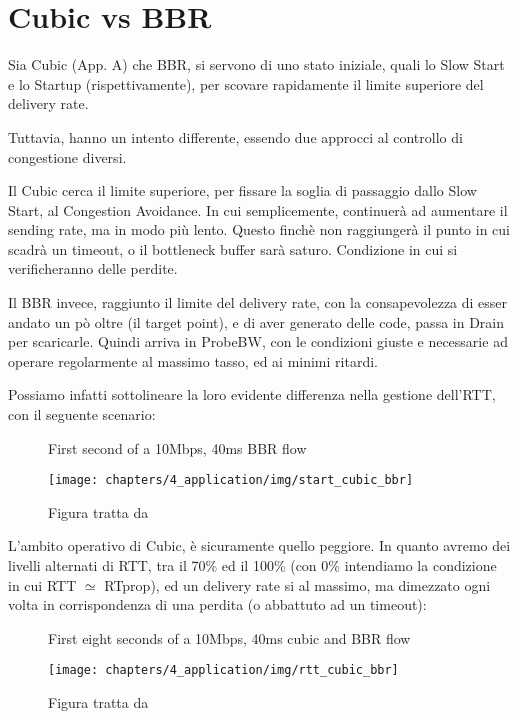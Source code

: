 \section{Cubic vs BBR}

Sia Cubic (App. A) che BBR, si servono di uno stato iniziale, quali lo Slow Start e lo Startup (rispettivamente), per scovare rapidamente il limite superiore del delivery rate. \bigskip

Tuttavia, hanno un intento differente, essendo due approcci al controllo di congestione diversi. \bigskip

Il Cubic cerca il limite superiore, per fissare la soglia di passaggio dallo Slow Start, al Congestion Avoidance. In cui semplicemente, continuerà ad aumentare il sending rate, ma in modo più lento. Questo finchè non raggiungerà il punto in cui scadrà un timeout, o il bottleneck buffer sarà saturo. Condizione in cui si verificheranno delle perdite. \bigskip

Il BBR invece, raggiunto il limite del delivery rate, con la consapevolezza di esser andato un pò oltre (il target point), e di aver generato delle code, passa in Drain per scaricarle.
Quindi arriva in ProbeBW, con le condizioni giuste e necessarie ad operare regolarmente al massimo tasso, ed ai minimi ritardi. \bigskip

Possiamo infatti sottolineare la loro evidente differenza nella gestione dell'RTT, con il seguente scenario:

\begin{figure}[H]

\center
\caption{First second of a 10Mbps, 40ms BBR flow}
\texttt{[image: chapters/4\_application/img/start\_cubic\_bbr]}
\caption*{Figura tratta da \cite[p.~63]{Cardwell:2017:BCC:3042068.3009824}}

\end{figure}

L'ambito operativo di Cubic, è sicuramente quello peggiore. In quanto avremo dei livelli alternati di RTT, tra il 70\% ed il 100\% (con 0\% intendiamo la condizione in cui RTT $ \simeq $ RTprop), ed un delivery rate si al massimo, ma dimezzato ogni volta in corrispondenza di una perdita (o abbattuto ad un timeout):

\begin{figure}[H]

\center
\caption{First eight seconds of a 10Mbps, 40ms cubic and BBR flow}
\texttt{[image: chapters/4\_application/img/rtt\_cubic\_bbr]}
\caption*{Figura tratta da \cite[p.~64]{Cardwell:2017:BCC:3042068.3009824}}

\end{figure}

